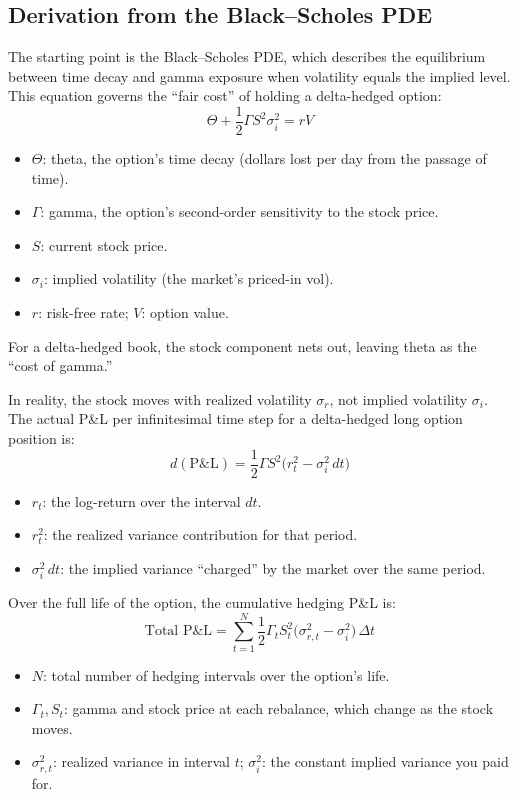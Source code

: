 \subsection{Derivation from the Black--Scholes PDE}

The starting point is the Black--Scholes PDE, which describes the equilibrium between time decay and gamma exposure when volatility equals the implied level. This equation governs the ``fair cost'' of holding a delta-hedged option:
\begin{equation}
\Theta + \frac{1}{2}\Gamma S^2 \sigma_i^2 = rV
\label{eq:bs-pde-hedged}
\end{equation}
\begin{itemize}[nosep]
  \item $\Theta$: theta, the option's time decay (dollars lost per day from the passage of time).
  \item $\Gamma$: gamma, the option's second-order sensitivity to the stock price.
  \item $S$: current stock price.
  \item $\sigma_i$: implied volatility (the market's priced-in vol).
  \item $r$: risk-free rate; $V$: option value.
\end{itemize}
For a delta-hedged book, the stock component nets out, leaving theta as the ``cost of gamma.''

In reality, the stock moves with realized volatility $\sigma_r$, not implied volatility $\sigma_i$.
The actual P\&L per infinitesimal time step for a delta-hedged long option position is:
\begin{equation}
d(\text{P\&L}) = \frac{1}{2}\Gamma S^2 \bigl(r_t^2 - \sigma_i^2\,dt\bigr)
\label{eq:daily-gamma-pnl}
\end{equation}
\begin{itemize}[nosep]
  \item $r_t$: the log-return over the interval $dt$.
  \item $r_t^2$: the realized variance contribution for that period.
  \item $\sigma_i^2\,dt$: the implied variance ``charged'' by the market over the same period.
\end{itemize}

Over the full life of the option, the cumulative hedging P\&L is:
\begin{equation}
\text{Total P\&L} = \sum_{t=1}^{N} \frac{1}{2}\Gamma_t S_t^2 \bigl(\sigma_{r,t}^2 - \sigma_i^2\bigr)\,\Delta t
\label{eq:cumulative-gamma-pnl}
\end{equation}
\begin{itemize}[nosep]
  \item $N$: total number of hedging intervals over the option's life.
  \item $\Gamma_t, S_t$: gamma and stock price at each rebalance, which change as the stock moves.
  \item $\sigma_{r,t}^2$: realized variance in interval $t$; $\sigma_i^2$: the constant implied variance you paid for.
\end{itemize}

